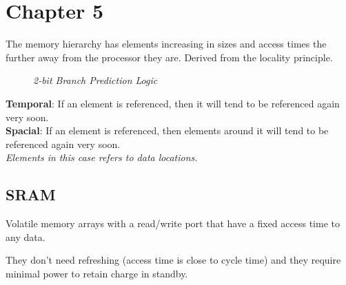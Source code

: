 \documentclass[11pt]{article}
\begin{document}
\section*{Chapter 5}

The memory hierarchy has elements increasing in sizes and access times the further away from the processor they are. Derived from the locality principle.

\begin{figure}[htbp]
    \centering
    \caption{\textit{2-bit Branch Prediction Logic}}
\end{figure}

\begin{tcolorbox}[
    enhanced,
    attach boxed title to top left={xshift=6mm,yshift=-1.5mm},
    colback=moonstoneblue!20,
    colframe=moonstoneblue,
    colbacktitle=moonstoneblue,
    title=Principle of Locality,
    fonttitle=\bfseries\color{white},
    boxed title style={size=small,colframe=moonstoneblue,sharp corners},
    sharp corners,
    label=box:logic-types,
]
    {\color{moondark}\textbf{Temporal}}: If an element is referenced, then it will tend to be referenced again very soon. \\
    {\color{moondark}\textbf{Spacial}}: If an element is referenced, then elements around it will tend to be referenced again very soon. \\
    \textit{Elements in this case refers to data locations.}
\end{tcolorbox}

\subsection*{SRAM}

Volatile memory arrays with a read/write port that have a fixed access time to any data.

They don't need refreshing (access time is close to cycle time) and they require minimal power to retain charge in standby.
\end{document}
